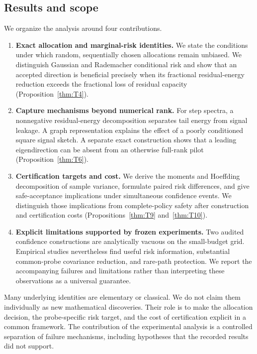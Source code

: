 \subsection{Results and scope}
We organize the analysis around four contributions.
\begin{enumerate}
\item \textbf{Exact allocation and marginal-risk identities.}
We state the conditions under which random, sequentially chosen allocations
remain unbiased. We distinguish Gaussian and Rademacher conditional risk and
show that an accepted direction is beneficial precisely when its fractional
residual-energy reduction exceeds the fractional loss of residual capacity
(Proposition~\ref{thm:T4}).
\item \textbf{Capture mechanisms beyond numerical rank.}
For step spectra, a nonnegative residual-energy decomposition separates tail
energy from signal leakage. A graph representation explains the effect of a
poorly conditioned square signal sketch. A separate exact construction shows
that a leading eigendirection can be absent from an otherwise full-rank pilot
(Proposition~\ref{thm:T6}).
\item \textbf{Certification targets and cost.}
We derive the moments and Hoeffding decomposition of sample variance,
formulate paired risk differences, and give safe-acceptance implications
under simultaneous confidence events. We distinguish those implications
from complete-policy safety after construction and certification costs
(Propositions~\ref{thm:T9} and~\ref{thm:T10}).
\item \textbf{Explicit limitations supported by frozen experiments.}
Two audited confidence constructions are analytically vacuous on the
small-budget grid. Empirical studies nevertheless find useful risk
information, substantial common-probe covariance reduction, and rare-path
protection. We report the accompanying failures and limitations rather than
interpreting these observations as a universal guarantee.
\end{enumerate}

Many underlying identities are elementary or classical. We do not claim
them individually as new mathematical discoveries. Their role is to make the
allocation decision, the probe-specific risk target, and the cost of
certification explicit in a common framework. The contribution of the
experimental analysis is a controlled separation of failure mechanisms,
including hypotheses that the recorded results did not support.

